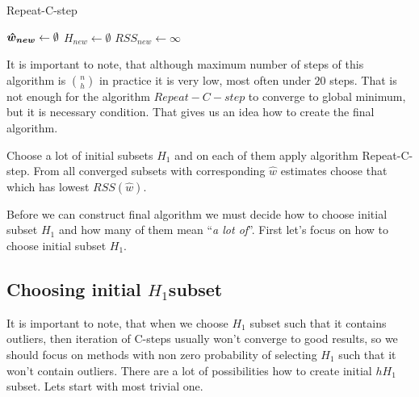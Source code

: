 \begin{algorithm}[H]
	\label{alg:RepeatCstep}
	\caption{Repeat-C-step}
	$\boldsymbol{\hat{w}_{new}} \gets \emptyset$\;
	$H_{new} \gets \emptyset$\;
	$RSS_{new} \gets \infty $\;


	\;
\end{algorithm}

It is important to note, that although maximum number of steps of this algorithm is ${n \choose h}$ in practice it is very low, most often under $20$ steps.
That is not enough for the algorithm $Repeat-C-step$ to converge to global minimum, but it is necessary condition. That gives us an idea how to create the final algorithm. \cite{rouss:2000}

Choose a lot of initial subsets $H_1$ and on each of them apply algorithm Repeat-C-step. From all converged subsets with corresponding $\hat{w}$ estimates choose that which has lowest $RSS(\hat{w})$. 

Before we can construct final algorithm we must decide how to choose initial subset $H_1$ and how many of them mean ``\emph{a lot of}''. First let's focus on how to choose initial subset $H_1$.


\subsection{Choosing initial $H_1$subset}

It is important to note, that when we choose $H_1$ subset such that it contains outliers, then iteration of  C-steps
usually won't converge to good results, so we should focus on methods with non zero probability of selecting $H_1$ such that it won't contain outliers.
There are a lot of possibilities how to create initial $hH_1$ subset. Lets start with most trivial one.


